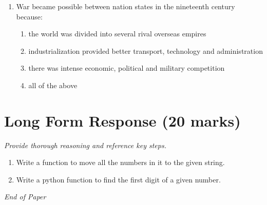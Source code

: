 \documentclass[12pt]{article}
\begin{document}
\begin{enumerate}[label=\arabic*.]
\begin{enumerate}[label=(\alph*)]
    \item a substance that does not break down over time
\end{enumerate}
\item War became possible between nation states in the nineteenth century because:
\begin{enumerate}[label=(\alph*)]
    \item the world was divided into several rival overseas empires
    \item industrialization provided better transport, technology and administration
    \item there was intense economic, political and military competition
    \item all of the above
\end{enumerate}
\end{enumerate}

\section*{Long Form Response (20 marks)}
\textit{Provide thorough reasoning and reference key steps.}
\begin{enumerate}[label=\arabic*.]
\item Write a function to move all the numbers in it to the given string.
\item Write a python function to find the first digit of a given number.
\end{enumerate}

\vfill
\noindent\textit{End of Paper}
\end{document}
